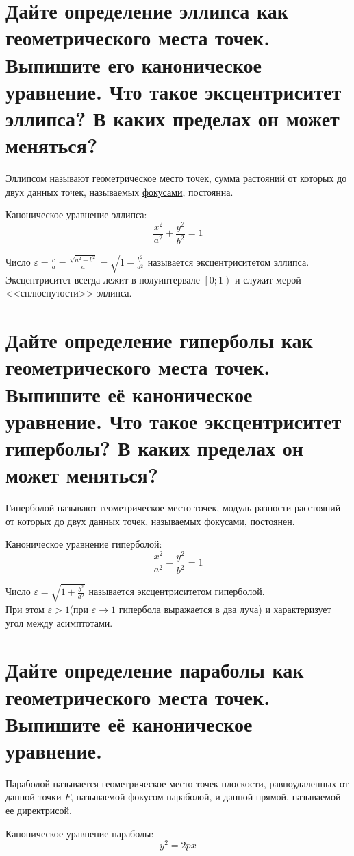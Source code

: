 \documentclass{article}
\begin{document}
\section{Дайте определение эллипса как геометрического места точек. Выпишите его каноническое уравнение. Что такое эксцентриситет эллипса? В каких пределах он может меняться?}
Эллипсом называют геометрическое место точек,
сумма растояний от которых до двух данных точек, 
называемых \underline{фокусами}, постоянна.
\begin{center}
    Каноническое уравнение эллипса:
    $$
    \frac{x^2}{a^2} + \frac{y^2}{b^2} = 1
    $$
\end{center}
Число $\varepsilon = \frac{c}{a} = \frac{\sqrt{a^2 - b^2}}{a} = \sqrt{1 - \frac{b^2}{a^2}}$
называется эксцентриситетом эллипса.
\\
Эксцентриситет всегда лежит в полуинтервале $\left[0;1\right)$
и служит мерой <<сплюснутости>> эллипса.

\section{Дайте определение гиперболы как геометрического места точек. Выпишите её каноническое уравнение. Что такое эксцентриситет гиперболы? В каких пределах он может меняться?}
Гиперболой называют геометрическое место точек,
модуль разности расстояний от которых до двух данных точек,
называемых фокусами, постоянен.
\begin{center}
    Каноническое уравнение гиперболой:
    $$
    \frac{x^2}{a^2} - \frac{y^2}{b^2} = 1
    $$
\end{center}
Число $\varepsilon = \sqrt{1 + \frac{b^2}{a^2}}$
называется эксцентриситетом гиперболой.
\\
При этом $\varepsilon > 1$(при $\varepsilon \longrightarrow 1$
гипербола выражается в два луча) и характеризует
угол между асимптотами.

\section{Дайте определение параболы как геометрического места точек. Выпишите её каноническое уравнение.}
Параболой называется геометрическое место точек плоскости,
равноудаленных от данной точки $F$, называемой фокусом параболой,
и данной прямой, называемой ее директрисой.
\begin{center}
    Каноническое уравнение параболы:
    $$
    y^2 = 2px
    $$
\end{center}
\end{document}
